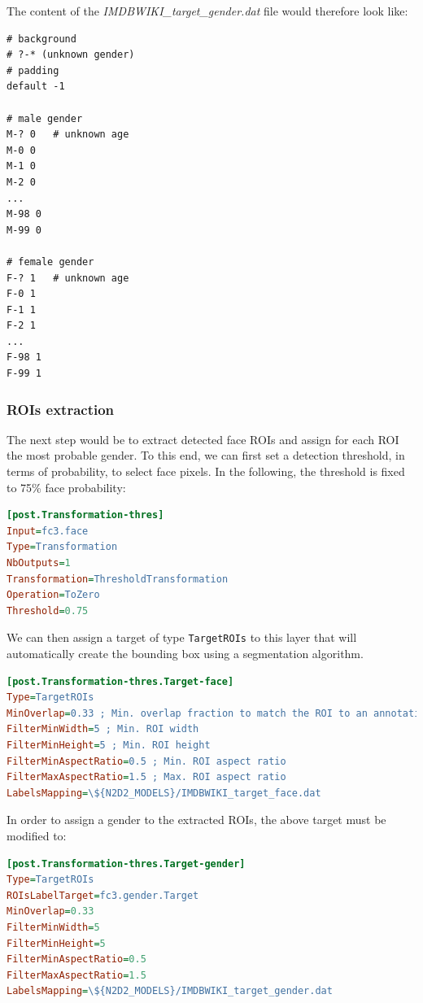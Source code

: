 \documentclass[a4paper,11pt,oneside]{article}
\begin{document}
The content of the \emph{IMDBWIKI\_target\_gender.dat} file would therefore look
like:

\begin{lstlisting}
# background
# ?-* (unknown gender)
# padding
default -1

# male gender
M-? 0   # unknown age
M-0 0
M-1 0
M-2 0
...
M-98 0
M-99 0

# female gender
F-? 1   # unknown age
F-0 1
F-1 1
F-2 1
...
F-98 1
F-99 1
\end{lstlisting}

\subsubsection{ROIs extraction}

The next step would be to extract detected face ROIs and assign for each ROI the
most probable gender. To this end, we can first set a detection threshold, in
terms of probability, to select face pixels. In the following, the threshold is
fixed to 75\% face probability:

\begin{lstlisting}[language=ini]
[post.Transformation-thres]
Input=fc3.face
Type=Transformation
NbOutputs=1
Transformation=ThresholdTransformation
Operation=ToZero
Threshold=0.75
\end{lstlisting}

We can then assign a target of type \lstinline!TargetROIs! to this layer that
will automatically create the bounding box using a segmentation algorithm.

\begin{lstlisting}[language=ini]
[post.Transformation-thres.Target-face]
Type=TargetROIs
MinOverlap=0.33 ; Min. overlap fraction to match the ROI to an annotation
FilterMinWidth=5 ; Min. ROI width
FilterMinHeight=5 ; Min. ROI height
FilterMinAspectRatio=0.5 ; Min. ROI aspect ratio
FilterMaxAspectRatio=1.5 ; Max. ROI aspect ratio
LabelsMapping=\${N2D2_MODELS}/IMDBWIKI_target_face.dat
\end{lstlisting}

In order to assign a gender to the extracted ROIs, the above target must be
modified to:

\begin{lstlisting}[language=ini]
[post.Transformation-thres.Target-gender]
Type=TargetROIs
ROIsLabelTarget=fc3.gender.Target
MinOverlap=0.33
FilterMinWidth=5
FilterMinHeight=5
FilterMinAspectRatio=0.5
FilterMaxAspectRatio=1.5
LabelsMapping=\${N2D2_MODELS}/IMDBWIKI_target_gender.dat
\end{lstlisting}
\end{document}
